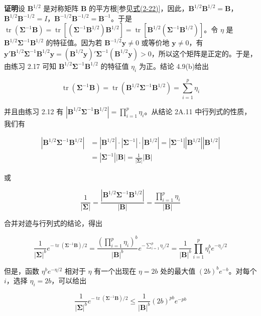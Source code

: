 \noindent\textbf{证明}\quad 设 $\boldsymbol{B}^{1/2}$ 是对称矩阵 $\boldsymbol{B}$ 的平方根[参见\hyperref[eq:2-22]{式(2-22)}]，因此，$\boldsymbol{B}^{1/2}\boldsymbol{B}^{1/2}=\boldsymbol{B}$，$\boldsymbol{B}^{1/2}\boldsymbol{B}^{-1/2}=I$，$\boldsymbol{B}^{-1/2}\boldsymbol{B}^{-1/2}=\boldsymbol{B}^{-1}$。于是 $\operatorname{tr}(\boldsymbol{\Sigma}^{-1}\boldsymbol{B})=\operatorname{tr}[(\boldsymbol{\Sigma}^{-1}\boldsymbol{B}^{1/2})\boldsymbol{B}^{1/2}]=\operatorname{tr}[\boldsymbol{B}^{1/2}(\boldsymbol{\Sigma}^{-1}\boldsymbol{B}^{1/2})]$。令 $\eta$ 是 $\boldsymbol{B}^{1/2}\boldsymbol{\Sigma}^{-1}\boldsymbol{B}^{1/2}$ 的特征值。因为若 $\boldsymbol{B}^{-1/2}\mathbf{y}\neq0$ 或等价地 $\mathbf{y}\neq0$，有 $\mathbf{y}'\boldsymbol{B}^{1/2}\boldsymbol{\Sigma}^{-1}\boldsymbol{B}^{1/2}\mathbf{y}=(\boldsymbol{B}^{1/2}\mathbf{y})'\boldsymbol{\Sigma}^{-1}(\boldsymbol{B}^{1/2}\mathbf{y})>0$，所以这个矩阵是正定的。于是，由练习 2.17 可知 $\boldsymbol{B}^{1/2}\boldsymbol{\Sigma}^{-1}\boldsymbol{B}^{1/2}$ 的特征值 $\eta_i$ 为正。结论 4.9(b)给出

\[
\operatorname{tr}(\boldsymbol{\Sigma}^{-1}\boldsymbol{B})=\operatorname{tr}(\boldsymbol{B}^{1/2}\boldsymbol{\Sigma}^{-1}\boldsymbol{B}^{1/2})=\sum_{i=1}^{p}\eta_i
\]

并且由练习 2.12 有 $|\boldsymbol{B}^{1/2}\boldsymbol{\Sigma}^{-1}\boldsymbol{B}^{1/2}|=\prod\limits_{i=1}^{p}\eta_i$。从结论 2A.11 中行列式的性质，我们有

\begin{align*}
|\boldsymbol{B}^{1/2}\boldsymbol{\Sigma}^{-1}\boldsymbol{B}^{1/2}|&=|\boldsymbol{B}^{1/2}|\cdot|\boldsymbol{\Sigma}^{-1}|\cdot|\boldsymbol{B}^{1/2}|=|\boldsymbol{\Sigma}^{-1}||\boldsymbol{B}^{1/2}||\boldsymbol{B}^{1/2}|\\
&=|\boldsymbol{\Sigma}^{-1}||\boldsymbol{B}|=\frac{1}{|\boldsymbol{\Sigma}|}|\boldsymbol{B}|
\end{align*}

或

\[
\frac{1}{|\boldsymbol{\Sigma}|}=\frac{|\boldsymbol{B}^{1/2}\boldsymbol{\Sigma}^{-1}\boldsymbol{B}^{1/2}|}{|\boldsymbol{B}|}=\frac{\prod\limits_{i=1}^{p}\eta_i}{|\boldsymbol{B}|}
\]

合并对迹与行列式的结论，得出

\[
\frac{1}{|\boldsymbol{\Sigma}|^b}e^{-\operatorname{tr}(\boldsymbol{\Sigma}^{-1}\boldsymbol{B})/2}=\frac{\left(\prod\limits_{i=1}^{p}\eta_i\right)^b}{|\boldsymbol{B}|^b}e^{-\sum\limits_{i=1}^{p}\eta_i/2}=\frac{1}{|\boldsymbol{B}|^b}\prod_{i=1}^{p}\eta_i^be^{-\eta_i/2}
\]

但是，函数 $\eta^be^{-\eta/2}$ 相对于 $\eta$ 有一个出现在 $\eta=2b$ 处的最大值 $(2b)^be^{-b}$。对每个 $i$，选择 $\eta_i=2b$，可以给出

\[
\frac{1}{|\boldsymbol{\Sigma}|^b}e^{-\operatorname{tr}(\boldsymbol{\Sigma}^{-1}\boldsymbol{B})/2}\leqslant\frac{1}{|\boldsymbol{B}|^b}(2b)^{pb}e^{-pb}
\]
